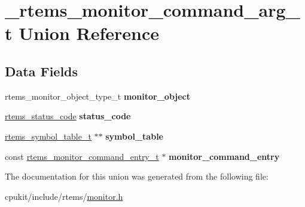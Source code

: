 \hypertarget{union__rtems__monitor__command__arg__t}{}\section{\+\_\+rtems\+\_\+monitor\+\_\+command\+\_\+arg\+\_\+t Union Reference}
\label{union__rtems__monitor__command__arg__t}
\subsection*{Data Fields}
\begin{DoxyCompactItemize}
\item 
\mbox{\label{union__rtems__monitor__command__arg__t_aa0e9b51c9231f758a9cea97b575ffcb8}} 
rtems\+\_\+monitor\+\_\+object\+\_\+type\+\_\+t {\bfseries monitor\+\_\+object}
\item 
\mbox{\label{union__rtems__monitor__command__arg__t_a45b42b6a09c72d747fe055cdd60ad5dc}} 
\mbox{\hyperlink{group__ClassicStatus_ga545d41846817eaba6143d52ee4d9e9fe}{rtems\+\_\+status\+\_\+code}} {\bfseries status\+\_\+code}
\item 
\mbox{\label{union__rtems__monitor__command__arg__t_afc31a3319ea7facb422448f326a535da}} 
\mbox{\hyperlink{struct__rtems__symbol__table__t}{rtems\+\_\+symbol\+\_\+table\+\_\+t}} $\ast$$\ast$ {\bfseries symbol\+\_\+table}
\item 
\mbox{\label{union__rtems__monitor__command__arg__t_a9300f50ac0d8c8440db9cfe94d98f8d0}} 
const \mbox{\hyperlink{structrtems__monitor__command__entry__s}{rtems\+\_\+monitor\+\_\+command\+\_\+entry\+\_\+t}} $\ast$ {\bfseries monitor\+\_\+command\+\_\+entry}
\end{DoxyCompactItemize}


The documentation for this union was generated from the following file\+:\begin{DoxyCompactItemize}
\item 
cpukit/include/rtems/\mbox{\hyperlink{monitor_8h}{monitor.\+h}}\end{DoxyCompactItemize}
